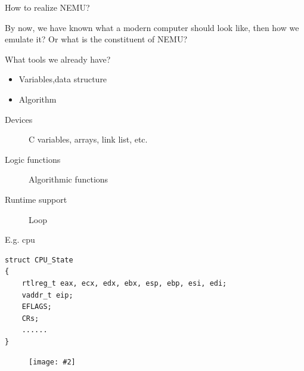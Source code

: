 \documentclass{beamer}
\newcommand{\fignocaption}[2]{
	\begin{figure}[htp]
		\centering
		\texttt{[image: \#2]}
	\end{figure}
}
\begin{document}
%
%
%

\begin{frame}{How to realize NEMU?}
	\begin{block}{}
		By now, we have known what a modern computer should look like, then how we emulate it? Or what is the constituent of NEMU?
	\end{block}
\pause
	\begin{block}{What tools we already have?}
		\pause
		\begin{itemize}
			\item Variables,data structure
			\item Algorithm
		\end{itemize}


	\end{block}
	\begin{description}
		\item[Devices] C variables, arrays, link list, etc.
		\item[Logic functions] Algorithmic functions
		\item[Runtime support] Loop
	\end{description}
\end{frame}

\begin{frame}[fragile]{E.g. cpu}
\begin{verbatim}
struct CPU_State
{
    rtlreg_t eax, ecx, edx, ebx, esp, ebp, esi, edi;
    vaddr_t eip;
    EFLAGS;
    CRs;
    ......
}
\end{verbatim}
\fignocaption{scale=0.2}{cpu.jpg}
\end{frame}
\end{document}
